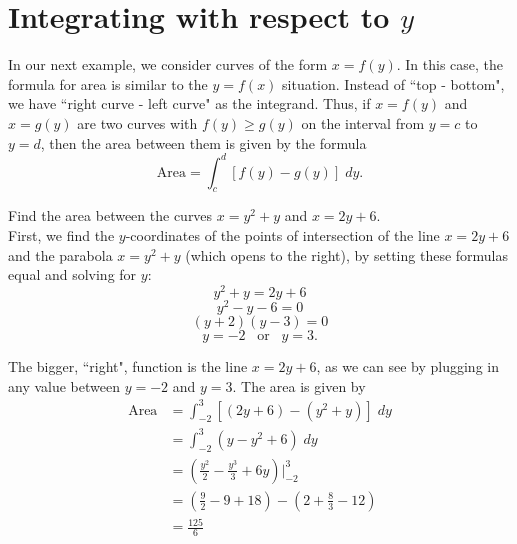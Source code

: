 \documentclass[handout]{ximera}
\begin{document}
\section{Integrating with respect to $y$}
In our next example, we consider curves of the form $x = f(y)$. In this case, 
the formula for area is similar to the $y = f(x)$ situation. Instead of ``top - bottom", we have ``right curve - left curve" as the integrand.
Thus, if $x = f(y)$ and $x = g(y)$ are two curves with $f(y) \geq g(y)$ on the interval from $y = c$ to $y = d$, 
then the area between them is given by the formula
\[
\text{Area} = \int_c^d [f(y) - g(y)] \; dy.
\]
\begin{example}[example 9]
Find the area between the curves $x = y^2 + y$ and $x = 2y + 6$.\\
First, we find the $y$-coordinates of the points of intersection of the line $x = 2y+6$ 
and the parabola $x=y^2 + y$ (which opens to the right), by setting these formulas equal and solving for $y$:
\[
y^2 + y = 2y + 6
\]
\[
y^2 - y -  6 = 0
\]
\[
(y+2)(y-3) = 0
\]
\[
y = -2 \;\;\; \text{or}  \;\;\; y = 3.
\]

The bigger, ``right", function is the line $x = 2y+6$, as we can see by plugging in any value between $y = -2$ and $y=3$.
The area is given by
\begin{align*}
\text{Area} &= \int_{-2}^3 \left[(2y+6) - (y^2+y) \right] \; dy \\
            &= \int_{-2}^3 \left(y - y^2 + 6\right) \; dy \\
            &= \left(\frac{y^2}{2} - \frac{y^3}{3} + 6y \right) \bigg|_{-2}^{3} \\
            &= \left(\tfrac92 - 9 + 18\right) - \left(2 + \tfrac83 - 12\right)\\
            &= \tfrac{125}{6}         
\end{align*}


\begin{center}
\end{center}
\end{example}
\end{document}
